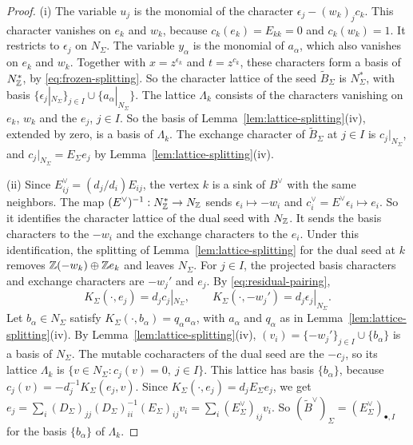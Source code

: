 \documentclass[12pt, letter]{amsart}
\theoremstyle{definition}
\begin{document}
\begin{proof}
(i) The variable $u_j$ is the monomial of the character $\epsilon_j-(w_k)_jc_k$.
This character vanishes on $e_k$ and $w_k$, because $c_k(e_k)=E_{kk}=0$ and $c_k(w_k)=1$.
It restricts to $\epsilon_j$ on $N_\Sigma$.
The variable $y_\alpha$ is the monomial of $a_\alpha$, which also vanishes on $e_k$ and $w_k$.
Together with $x=z^{\epsilon_k}$ and $t=z^{c_k}$, these characters form a basis of $N_{\mathbb{Z}}^*$, by \eqref{eq:frozen-splitting}.
So the character lattice of the seed $\widetilde B_\Sigma$ is $N_\Sigma^*$, with basis $\{\epsilon_j|_{N_\Sigma}\}_{j\in I}\cup\{a_\alpha|_{N_\Sigma}\}$.
The lattice $\Lambda_k$ consists of the characters vanishing on $e_k$, $w_k$ and the $e_j$, $j\in I$.
So the basis of Lemma~\ref{lem:lattice-splitting}(iv), extended by zero, is a basis of $\Lambda_k$.
The exchange character of $\widetilde B_\Sigma$ at $j\in I$ is $c_j|_{N_\Sigma}$, and $c_j|_{N_\Sigma}=E_\Sigma e_j$ by Lemma~\ref{lem:lattice-splitting}(iv).

(ii) Since $E^\vee_{ij}=(d_j/d_i)E_{ij}$, the vertex $k$ is a sink of $B^\vee$ with the same neighbors.
The map $(E^\vee)^{-1}:N_{\mathbb{Z}}^*\to N_{\mathbb{Z}}$ sends $\epsilon_i\mapsto-w_i$ and $c^\vee_i=E^\vee\epsilon_i\mapsto e_i$.
So it identifies the character lattice of the dual seed with $N_{\mathbb{Z}}$.
It sends the basis characters to the $-w_i$ and the exchange characters to the $e_i$.
Under this identification, the splitting of Lemma~\ref{lem:lattice-splitting} for the dual seed at $k$ removes $\mathbb{Z}(-w_k)\oplus\mathbb{Z} e_k$ and leaves $N_\Sigma$.
For $j\in I$, the projected basis characters and exchange characters are $-w_j'$ and $e_j$.
By \eqref{eq:residual-pairing},
\[
 K_\Sigma(\cdot,e_j)=d_jc_j|_{N_\Sigma},\qquad K_\Sigma(\cdot,-w_j')=d_j\epsilon_j|_{N_\Sigma}.
\]
Let $b_\alpha\in N_\Sigma$ satisfy $K_\Sigma(\cdot,b_\alpha)=q_\alpha a_\alpha$, with $a_\alpha$ and $q_\alpha$ as in Lemma~\ref{lem:lattice-splitting}(iv).
By Lemma~\ref{lem:lattice-splitting}(iv), $(v_i)=\{-w_j'\}_{j\in I}\cup\{b_\alpha\}$ is a basis of $N_\Sigma$.
The mutable cocharacters of the dual seed are the $-c_j$, so its lattice $\Lambda_k$ is $\{v\in N_\Sigma:c_j(v)=0,\ j\in I\}$.
This lattice has basis $\{b_\alpha\}$, because $c_j(v)=-d_j^{-1}K_\Sigma(e_j,v)$.
Since $K_\Sigma(\cdot,e_j)=d_jE_\Sigma e_j$, we get $e_j=\sum_i(D_\Sigma)_{jj}(D_\Sigma)_{ii}^{-1}(E_\Sigma)_{ij}v_i=\sum_i(E_\Sigma^\vee)_{ij}v_i$.
So $(\widetilde B^\vee)_\Sigma=(E_\Sigma^\vee)_{\bullet,I}$ for the basis $\{b_\alpha\}$ of $\Lambda_k$.
\end{proof}
\end{document}
